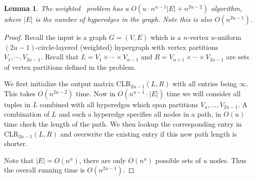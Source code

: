 \documentclass[11pt,letterpaper,pdftex]{article}
\newtheorem{lemma}[theorem]{Lemma}
\begin{document}
\begin{lemma}
    The weighted \uCLR~problem has a $O(u \cdot n^{u-1}|E| + n^{2u-2})$ algorithm, where $|E|$ is the number of hyperedges in the graph. Note this is also $O(n^{2u-1})$.
    \label{lem:weighteduCLRAlg}
\end{lemma}
\begin{proof}
Recall the input is a graph $G=(V,E)$ which is a $n$-vertex $u$-uniform $(2u-1)$-circle-layered (weighted) hypergraph with vertex partitions $V_1, \cdots, V_{2u-1}$. 
Recall that $L=V_1 \times \cdots \times V_{u-1}$ and $R=V_{u+1} \times \cdots \times V_{2u-1}$ are sets of vertex partitions defined in the problem.


We first initialize the output matrix CLR$_{2u-1}(L,R)$ with all entries being $\infty$. This takes $O(n^{2u-2})$ time.  Now in $O(n^{u-1} \cdot |E|)$ time we will consider all tuples in $L$ combined with all hyperedges which span partitions $V_{u}, \ldots,V_{2u-1}$. A combination of $L$ and such a hyperedge specifies all nodes in a path, in $O(u)$ time check the length of the path. We then lookup the corresponding entry in CLR$_{2u-1}(L,R)$ and overwrite the existing entry if this new path length is shorter. 

Note that $|E| = O(n^u)$, there are only $O(n^u)$ possible sets of $u$ nodes. Thus the overall running time is $O(n^{2u-1})$.
\end{proof}
\end{document}
